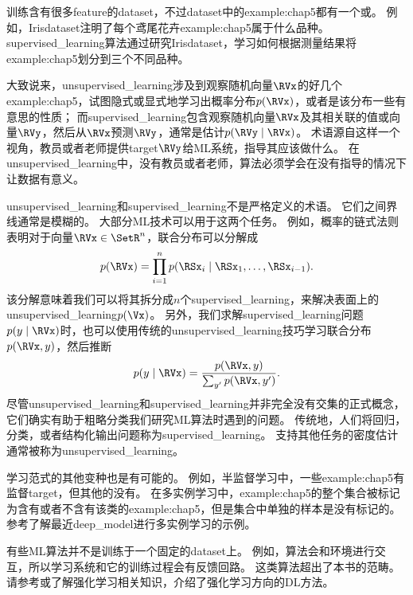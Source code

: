 训练含有很多\gls{feature}的\gls{dataset}，不过\gls{dataset}中的\gls{example:chap5}都有一个或。
例如，Iris\gls{dataset}注明了每个鸢尾花卉\gls{example:chap5}属于什么品种。
\gls{supervised_learning}算法通过研究Iris\gls{dataset}，学习如何根据测量结果将\gls{example:chap5}划分到三个不同品种。

大致说来，\gls{unsupervised_learning}涉及到观察随机向量$\RVx$的好几个\gls{example:chap5}，试图隐式或显式地学习出概率分布$p(\RVx)$，或者是该分布一些有意思的性质；
而\gls{supervised_learning}包含观察随机向量$\RVx$及其相关联的值或向量$\RVy$，然后从$\RVx$预测$\RVy$，通常是估计$p(\RVy\mid\RVx)$。
术语源自这样一个视角，教员或者老师提供\gls{target}$\RVy$给\gls{ML}系统，指导其应该做什么。
在\gls{unsupervised_learning}中，没有教员或者老师，算法必须学会在没有指导的情况下让数据有意义。

\gls{unsupervised_learning}和\gls{supervised_learning}不是严格定义的术语。
它们之间界线通常是模糊的。
大部分\gls{ML}技术可以用于这两个任务。
例如，概率的链式法则表明对于向量$\RVx\in\SetR^n$，联合分布可以分解成
\begin{equation}
    p(\RVx) = \prod_{i=1}^n p(\RSx_i \mid \RSx_1,\dots,\RSx_{i-1}) .
\end{equation}
该分解意味着我们可以将其拆分成$n$个\gls{supervised_learning}，来解决表面上的\gls{unsupervised_learning}$p(\Vx)$。
另外，我们求解\gls{supervised_learning}问题$p(y\mid\RVx)$时，也可以使用传统的\gls{unsupervised_learning}技巧学习联合分布$p(\RVx,y)$，然后推断
\begin{equation}
    p(y\mid\RVx) = \frac{p(\RVx,y)}{\sum_{y'}p(\RVx,y')}.
\end{equation}
尽管\gls{unsupervised_learning}和\gls{supervised_learning}并非完全没有交集的正式概念，它们确实有助于粗略分类我们研究\gls{ML}算法时遇到的问题。
传统地，人们将回归，分类，或者结构化输出问题称为\gls{supervised_learning}。
支持其他任务的密度估计通常被称为\gls{unsupervised_learning}。


学习范式的其他变种也是有可能的。
例如，半监督学习中，一些\gls{example:chap5}有监督\gls{target}，但其他的没有。
在多实例学习中，\gls{example:chap5}的整个集合被标记为含有或者不含有该类的\gls{example:chap5}，但是集合中单独的样本是没有标记的。
参考\cite{Kotzias2015}了解最近\gls{deep_model}进行多实例学习的示例。

有些\gls{ML}算法并不是训练于一个固定的\gls{dataset}上。
例如，算法会和环境进行交互，所以学习系统和它的训练过程会有反馈回路。
这类算法超出了本书的范畴。
请参考\cite{Sutton+Barto-98}或\cite{Bertsekas+Tsitsiklis-book1996}了解强化学习相关知识，\cite{Mnih2013}介绍了强化学习方向的\gls{DL}方法。

